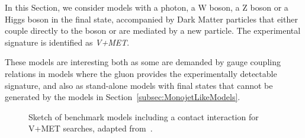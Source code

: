 
In this Section, we consider models with a photon, a W boson, a Z boson or a Higgs boson in the final state,
accompanied by Dark Matter particles that either couple directly to the boson or are mediated by
a new particle. The experimental signature is identified as \textit{V+MET}.

These models are interesting both as some are demanded by gauge coupling relations in models where the gluon provides
the experimentally detectable signature,
and also as stand-alone models with final states that cannot be generated by the models in
Section~\ref{subsec:MonojetLikeModels}.


\begin{figure}[h!]
  \centering
  \vspace{\baselineskip}
  \textwidth
  \begin{feynmandiagram}[modelVisr]
  \end{feynmandiagram}
  \begin{feynmandiagram}[modelVeft5pt]
  \end{feynmandiagram}

  \vspace{\baselineskip}
  \caption{Sketch of benchmark models including a contact interaction
  for V+MET searches, adapted from~\cite{Nelson:2013pqa}. \label{fig:VPlusMET_EFT}}
\end{figure}

